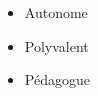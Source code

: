 %
%
%

\twocolumnsection
{
\begin{skills}
\end{skills}}
{
\vspace{1em}
\begin{itemize}
    	\item Autonome
    	\item Polyvalent
    	\item Pédagogue
\end{itemize}
}
